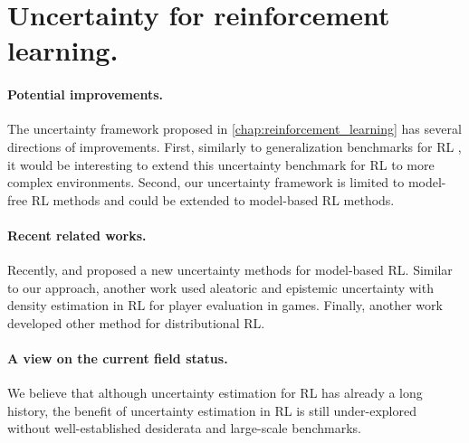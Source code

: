 \section{Uncertainty for reinforcement learning.}

\paragraph{Potential improvements.} The uncertainty framework proposed in \cref{chap:reinforcement_learning} has several directions of improvements. First, similarly to generalization benchmarks for RL \cite{generalization-rl-survey, assessing-generalization-rl, procgen}, it would be interesting to extend this uncertainty benchmark for RL to more complex environments. Second, our uncertainty framework is limited to model-free RL methods and could be extended to model-based RL methods. 

\paragraph{Recent related works.} Recently, \cite{tennenholtz2022plan} and \cite{wu2022plan} proposed a new uncertainty methods for model-based RL. Similar to our approach, another work \cite{liu2022uncertaintyaware} used aleatoric and epistemic uncertainty with density estimation  in RL for player evaluation in games. Finally, another work \cite{luo2022distributional} developed other method for distributional RL.

\paragraph{A view on the current field status.} We believe that although uncertainty estimation for RL has already a long history, the benefit of uncertainty estimation in RL is still under-explored without well-established desiderata and large-scale benchmarks.